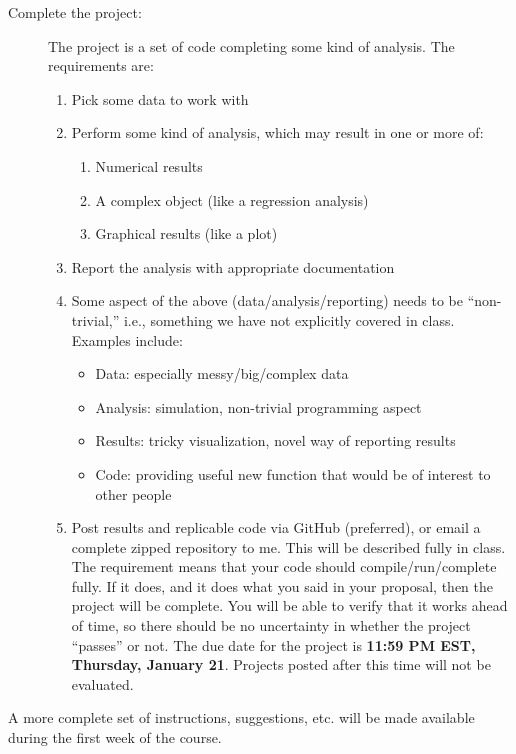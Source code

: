 \documentclass{tufte-handout}
\begin{document}
\begin{description}
\item[Complete the project:] The project is a set of code completing some kind of analysis. The requirements are:
\begin{enumerate}
\item Pick some data to work with
\item Perform some kind of analysis, which may result in one or more of:
\begin{enumerate}
\item Numerical results
\item A complex object (like a regression analysis)
\item Graphical results (like a plot)
\end{enumerate}
\item Report the analysis with appropriate documentation
\item Some aspect of the above (data/analysis/reporting) needs to be ``non-trivial,'' i.e., something we have not explicitly covered in class.  Examples include:
\begin{itemize}
\item Data: especially messy/big/complex data
\item Analysis: simulation, non-trivial programming aspect
\item Results: tricky visualization, novel way of reporting results
\item Code: providing useful new function that would be of interest to other people
\end{itemize}
\item Post results and replicable code via GitHub (preferred), or email a complete zipped repository to me. This will be described fully in class. The requirement means that your code should compile/run/complete fully. If it does, and it does what you said in your proposal, then the project will be complete.  You will be able to verify that it works ahead of time, so there should be no uncertainty in whether the project ``passes'' or not. The due date for the project is \textbf{11:59 PM EST, Thursday, January 21}. Projects posted after this time will not be evaluated.
\end{enumerate}
\end{description}

A more complete set of instructions, suggestions, etc. will be made available during the first week of the course.
\end{document}
